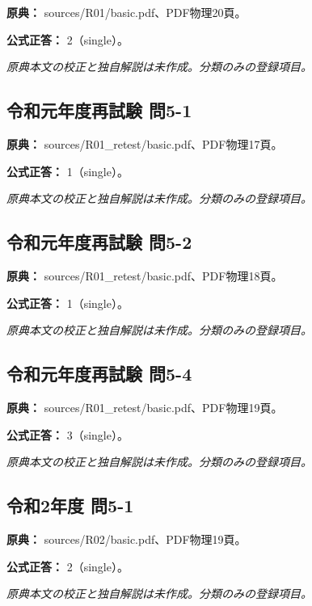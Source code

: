 \noindent\textbf{原典：} sources/R01/basic.pdf、PDF物理20頁。

\textbf{公式正答：} 2（single）。

\par\textit{原典本文の校正と独自解説は未作成。分類のみの登録項目。}

\subsection{令和元年度再試験 問5-1}
\label{q:r01-ret-basic-5-1}

\noindent\textbf{原典：} sources/R01\_retest/basic.pdf、PDF物理17頁。

\textbf{公式正答：} 1（single）。

\par\textit{原典本文の校正と独自解説は未作成。分類のみの登録項目。}

\subsection{令和元年度再試験 問5-2}
\label{q:r01-ret-basic-5-2}

\noindent\textbf{原典：} sources/R01\_retest/basic.pdf、PDF物理18頁。

\textbf{公式正答：} 1（single）。

\par\textit{原典本文の校正と独自解説は未作成。分類のみの登録項目。}

\subsection{令和元年度再試験 問5-4}
\label{q:r01-ret-basic-5-4}

\noindent\textbf{原典：} sources/R01\_retest/basic.pdf、PDF物理19頁。

\textbf{公式正答：} 3（single）。

\par\textit{原典本文の校正と独自解説は未作成。分類のみの登録項目。}

\subsection{令和2年度 問5-1}
\label{q:r02-reg-basic-5-1}

\noindent\textbf{原典：} sources/R02/basic.pdf、PDF物理19頁。

\textbf{公式正答：} 2（single）。

\par\textit{原典本文の校正と独自解説は未作成。分類のみの登録項目。}


